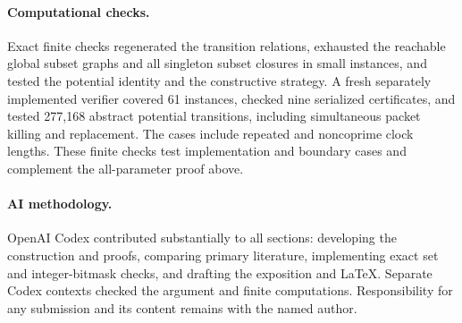 \documentclass[acmsmall,screen,nonacm,11pt]{acmart}
\begin{document}
\paragraph{Computational checks.}
Exact finite checks regenerated the transition relations, exhausted the
reachable global subset graphs and all singleton subset closures in small
instances, and tested the potential identity and the constructive strategy.
A fresh separately implemented verifier covered 61 instances, checked nine
serialized certificates, and tested 277,168 abstract potential transitions,
including simultaneous packet killing and replacement. The cases include
repeated and noncoprime clock lengths. These finite checks test implementation
and boundary cases and complement the all-parameter proof above.

\paragraph{AI methodology.}
OpenAI Codex contributed substantially to all sections: developing the
construction and proofs, comparing primary literature, implementing exact
set and integer-bitmask checks, and drafting the exposition and LaTeX.
Separate Codex contexts checked the argument and finite computations.
Responsibility for any submission and its content remains with the named author.



\end{document}
